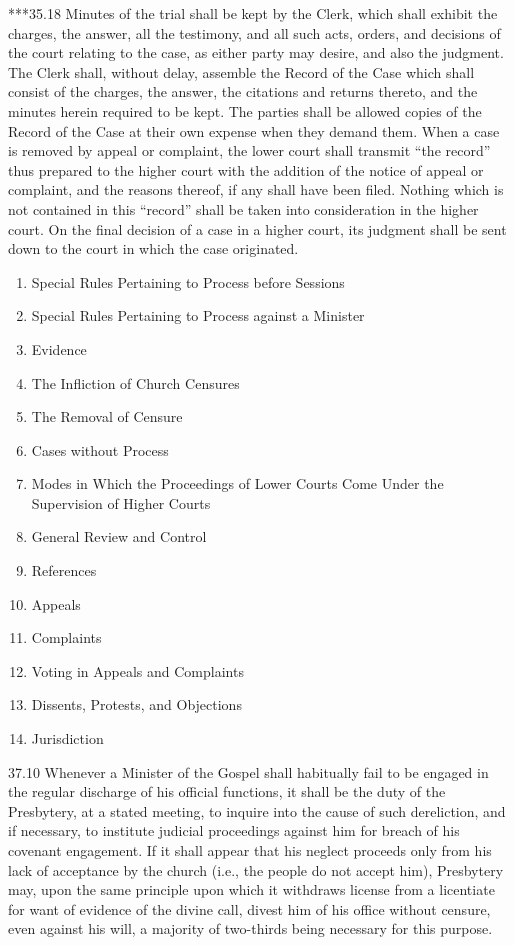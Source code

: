\documentclass[
]{book}
\providecommand{\tightlist}{%
  \setlength{\itemsep}{0pt}\setlength{\parskip}{0pt}}
\begin{document}
***35.18 Minutes of the trial shall be kept by the Clerk, which shall exhibit the charges, the answer, all the testimony, and all such acts, orders, and decisions of the court relating to the case, as either party may desire, and also the judgment. The Clerk shall, without delay, assemble the Record of the Case which shall consist of the charges, the answer, the citations and returns thereto, and the minutes herein required to be kept. The parties shall be allowed copies of the Record of the Case at their own expense when they demand them. When a case is removed by appeal or complaint, the lower court shall transmit ``the record'' thus prepared to the higher court with the addition of the notice of appeal or complaint, and the reasons thereof, if any shall have been filed. Nothing which is not contained in this ``record'' shall be taken into consideration in the higher court. On the final decision of a case in a higher court, its judgment shall be sent down to the court in which the case originated.

\begin{enumerate}
\def\labelenumi{\arabic{enumi}.}
\setcounter{enumi}{35}
\tightlist
\item
  Special Rules Pertaining to Process before Sessions
\item
  Special Rules Pertaining to Process against a Minister
\item
  Evidence
\item
  The Infliction of Church Censures
\item
  The Removal of Censure
\item
  Cases without Process
\item
  Modes in Which the Proceedings of Lower Courts Come Under the Supervision of Higher Courts
\item
  General Review and Control
\item
  References
\item
  Appeals
\item
  Complaints
\item
  Voting in Appeals and Complaints
\item
  Dissents, Protests, and Objections
\item
  Jurisdiction
\end{enumerate}

37.10 Whenever a Minister of the Gospel shall habitually fail to be engaged in the regular discharge of his official functions, it shall be the duty of the Presbytery, at a stated meeting, to inquire into the cause of such dereliction, and if necessary, to institute judicial proceedings against him for breach of his covenant engagement. If it shall appear that his neglect proceeds only from his lack of acceptance by the church (i.e., the people do not accept him), Presbytery may, upon the same principle upon which it withdraws license from a licentiate for want of evidence of the divine call, divest him of his office without censure, even against his will, a majority of two-thirds being necessary for this purpose.
\end{document}
